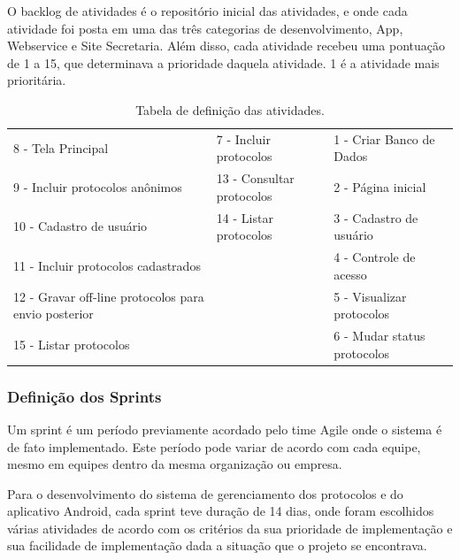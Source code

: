 \documentclass[
	article,			%
	11pt,				%
	oneside,			%
	a4paper,			%
	english,			%
	brazil,				%
	sumario=tradicional
	]{abntex2}
\begin{document}
O backlog de atividades é o repositório inicial das atividades, e onde cada atividade foi posta em uma das três categorias de desenvolvimento, App, Webservice e Site Secretaria.
Além disso, cada atividade recebeu uma pontuação de 1 a 15, que determinava a prioridade daquela atividade. 1 é a atividade mais prioritária.

\begin{table}[htbp]
    \caption{Tabela de definição das atividades.}
    \label{tabela-atividades}
    \begin{center}
        \begin{tabular}{|p{5cm}|p{4cm}|p{5cm}|}
            \hline
            8 - Tela Principal & 7 - Incluir protocolos & 1 - Criar Banco de Dados \\
            9 - Incluir protocolos anônimos & 13 - Consultar protocolos & 2 - Página inicial \\
            10 - Cadastro de usuário & 14 - Listar protocolos & 3 - Cadastro de usuário \\
            11 - Incluir protocolos cadastrados & & 4 - Controle de acesso \\
            12 - Gravar off-line protocolos para envio posterior & & 5 - Visualizar protocolos \\
            15 - Listar protocolos & & 6 - Mudar status protocolos \\
            \hline
        \end{tabular}
    \end{center}
\end{table}

\subsubsection{Definição dos Sprints}

Um sprint é um período previamente acordado pelo time Agile onde o sistema é de fato implementado.
Este período pode variar de acordo com cada equipe, mesmo em equipes dentro da mesma organização ou empresa.

Para o desenvolvimento do sistema de gerenciamento dos protocolos e do aplicativo Android, cada sprint teve duração de 14 dias, onde foram escolhidos várias atividades de acordo com os critérios da sua prioridade de implementação e sua facilidade de implementação dada a situação que o projeto se encontrava.
\end{document}
